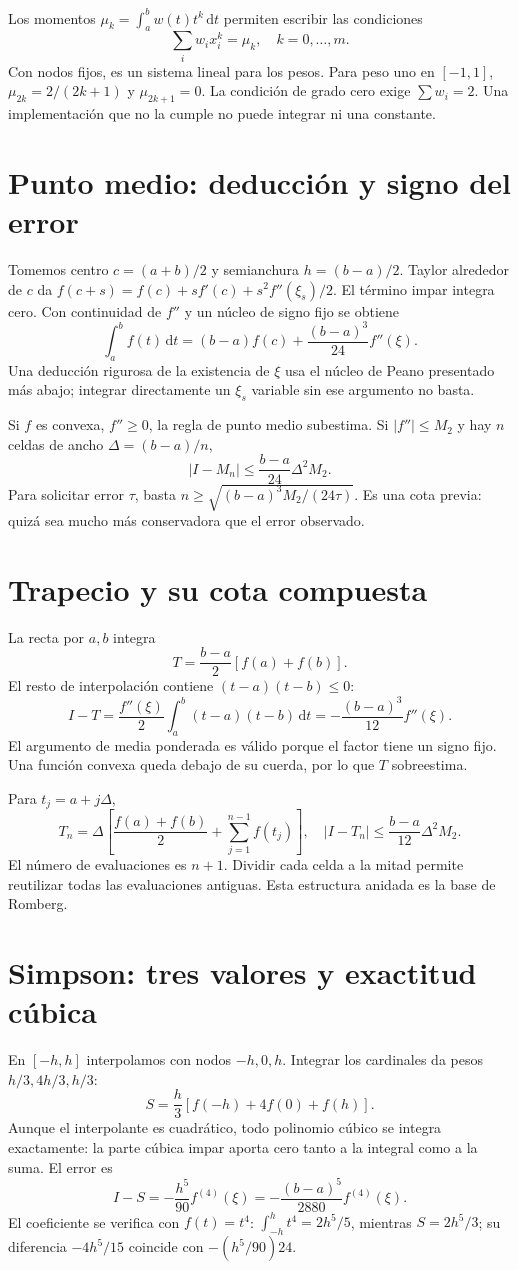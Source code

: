 \documentclass[11pt,a4paper]{article}
\newcommand{\dd}{\,\mathrm d}
\theoremstyle{definition}
\begin{document}
Los momentos $\mu_k=\int_a^b w(t)t^k\dd t$ permiten escribir las condiciones
\[
\sum_iw_i x_i^k=\mu_k,\quad k=0,\ldots,m.
\]
Con nodos fijos, es un sistema lineal para los pesos. Para peso uno en $[-1,1]$, $\mu_{2k}=2/(2k+1)$ y $\mu_{2k+1}=0$. La condición de grado cero exige $\sum w_i=2$. Una implementación que no la cumple no puede integrar ni una constante.

\section{Punto medio: deducción y signo del error}
Tomemos centro $c=(a+b)/2$ y semianchura $h=(b-a)/2$. Taylor alrededor de $c$ da
$f(c+s)=f(c)+sf'(c)+s^2f''(\xi_s)/2$. El término impar integra cero. Con continuidad de $f''$ y un núcleo de signo fijo se obtiene
\[
\int_a^b f(t)\dd t=(b-a)f(c)+\frac{(b-a)^3}{24}f''(\xi).
\]
Una deducción rigurosa de la existencia de $\xi$ usa el núcleo de Peano presentado más abajo; integrar directamente un $\xi_s$ variable sin ese argumento no basta.

Si $f$ es convexa, $f''\ge0$, la regla de punto medio subestima. Si $|f''|\le M_2$ y hay $n$ celdas de ancho $\Delta=(b-a)/n$,
\[
\left|I-M_n\right|\le\frac{b-a}{24}\Delta^2M_2.
\]
Para solicitar error $\tau$, basta $n\ge\sqrt{(b-a)^3M_2/(24\tau)}$. Es una cota previa: quizá sea mucho más conservadora que el error observado.

\section{Trapecio y su cota compuesta}
La recta por $a,b$ integra
\[
T=\frac{b-a}2[f(a)+f(b)].
\]
El resto de interpolación contiene $(t-a)(t-b)\le0$:
\[
I-T=\frac{f''(\xi)}2\int_a^b(t-a)(t-b)\dd t
=-\frac{(b-a)^3}{12}f''(\xi).
\]
El argumento de media ponderada es válido porque el factor tiene un signo fijo. Una función convexa queda debajo de su cuerda, por lo que $T$ sobreestima.

Para $t_j=a+j\Delta$,
\[
T_n=\Delta\left[\frac{f(a)+f(b)}2+\sum_{j=1}^{n-1}f(t_j)\right],
\quad
|I-T_n|\le\frac{b-a}{12}\Delta^2M_2.
\]
El número de evaluaciones es $n+1$. Dividir cada celda a la mitad permite reutilizar todas las evaluaciones antiguas. Esta estructura anidada es la base de Romberg.

\section{Simpson: tres valores y exactitud cúbica}
En $[-h,h]$ interpolamos con nodos $-h,0,h$. Integrar los cardinales da pesos $h/3,4h/3,h/3$:
\[
S=\frac h3[f(-h)+4f(0)+f(h)].
\]
Aunque el interpolante es cuadrático, todo polinomio cúbico se integra exactamente: la parte cúbica impar aporta cero tanto a la integral como a la suma. El error es
\[
I-S=-\frac{h^5}{90}f^{(4)}(\xi)
=-\frac{(b-a)^5}{2880}f^{(4)}(\xi).
\]
El coeficiente se verifica con $f(t)=t^4$: $\int_{-h}^h t^4=2h^5/5$, mientras $S=2h^5/3$; su diferencia $-4h^5/15$ coincide con $-(h^5/90)24$.
\end{document}
